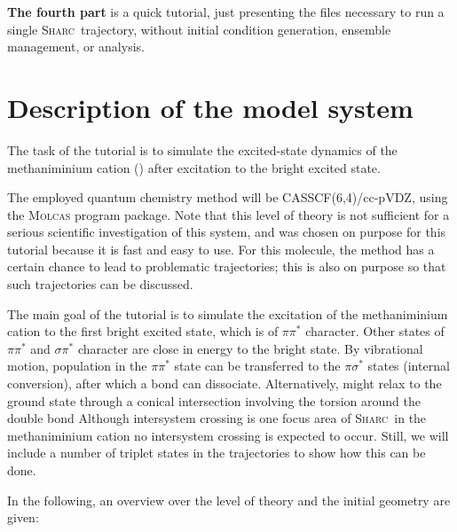 \documentclass[a4paper,11pt,DIV=15,openany]{scrbook}
\newcommand{\sharc}{\textsc{Sharc}}
\begin{document}
\textbf{The fourth part} is a quick tutorial, just presenting the files necessary to run a single \sharc\ trajectory, without initial condition generation, ensemble management, or analysis.



\section{Description of the model system}
\label{sec:model_system}

The task of the tutorial is to simulate the excited-state dynamics of the methaniminium cation () after excitation to the bright excited state.

The employed quantum chemistry method will be CASSCF(6,4)/cc-pVDZ, using the \textsc{Molcas} program package. 
Note that this level of theory is not sufficient for a serious scientific investigation of this system, and was chosen on purpose for this tutorial because it is fast and easy to use.
For this molecule, the method has a certain chance to lead to problematic trajectories; this is also on purpose so that such trajectories can be discussed.

The main goal of the tutorial is to simulate the excitation of the methaniminium cation to the first bright excited state, which is of $\pi\pi^*$ character.
Other states of $\pi\pi^*$ and $\sigma\pi^*$ character are close in energy to the bright state. 
By vibrational motion, population in the $\pi\pi^*$ state can be transferred to the $\pi\sigma^*$ states (internal conversion), after which a bond can dissociate.
Alternatively,  might relax to the ground state through a conical intersection involving the torsion around the double bond
Although intersystem crossing is one focus area of \sharc\, in the methaniminium cation no intersystem crossing is expected to occur. Still, we will include a number of triplet states in the trajectories to show how this can be done.

In the following, an overview over the level of theory and the initial geometry are given:
\end{document}
